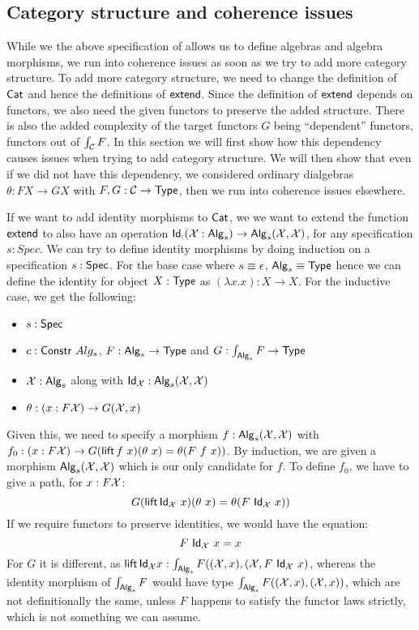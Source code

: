 \documentclass[a4paper,10pt]{article}
\begin{document}
\subsection{Category structure and coherence issues}
\label{sec:hitscategory}

While we the above specification of \hits allows us to define algebras
and algebra morphisms, we run into coherence issues as soon as we try
to add more category structure. To add more category structure, we
need to change the definition of $\mathsf{Cat}$ and hence the definitions of
$\mathsf{extend}$. Since the definition of $\mathsf{extend}$ depends on functors, we
also need the given functors to preserve the added structure. There is
also the added complexity of the target functors $G$ being
``dependent'' functors, \ie functors out of $\int_{\mathcal{C}} F$. In this
section we will first show how this dependency causes issues when
trying to add category structure. We will then show that even if we
did not have this dependency, \ie we considered ordinary dialgebras
$\theta : F X \to G X$ with $F, G : \mathcal{C} \to \mathsf{Type}$, then we run into
coherence issues elsewhere.

If we want to add identity morphisms to $\mathsf{Cat}$, we we want to extend
the function $\mathsf{extend}$ to also have an operation
$\mathsf{Id}_{:} (\mathcal{X} : \mathsf{Alg}_s) \to \mathsf{Alg}_s(\mathcal{X},\mathcal{X})$, for any
specification $s : Spec$. We can try to define identity morphisms by
doing induction on a specification $s : \mathsf{Spec}$. For the base case
where $s \equiv \epsilon$, $\mathsf{Alg}_s \equiv \mathsf{Type}$ hence we can define
the identity for object $X : \mathsf{Type}$ as $(\lambda x . x) : X \to X$. For
the inductive case, we get the following:
%
\begin{itemize}
\item $s : \mathsf{Spec}$ 
\item $c : \mathsf{Constr}\ Alg_s$, \ie $F : \mathsf{Alg}_s \to \mathsf{Type}$ and $G : \int_{\mathsf{Alg}_s} F \to \mathsf{Type}$
\item $\mathcal{X} : \mathsf{Alg}_s$ along with
  $\mathsf{Id}_{\mathcal{X}} : \mathsf{Alg}_s (\mathcal{X},\mathcal{X})$
\item  $\theta : (x : F \mathcal{X}) \to G (\mathcal{X}, x)$
\end{itemize}
%
Given this, we need to specify a morphism
$f : \mathsf{Alg}_s (\mathcal{X},\mathcal{X})$ with
$f_0 : (x : F \alg{X}) \to G (\lift f\ x) (\theta\ x) = \theta (F\ f\
x))$.
By induction, we are given a morphism $\mathsf{Alg}_s (\mathcal{X},\mathcal{X})$ which
is our only candidate for $f$. To define $f_0$, we have to give a path, for $x : F \mathcal{X}$:
$$
G (\operatorname{\mathsf{lift}} \mathsf{Id}_{\mathcal{X}}\ x) (\theta\ x) = \theta (F\ \mathsf{Id}_{\mathcal{X}}\ x))
$$
If we require functors to preserve identities, we would have the equation:
$$
F\ \mathsf{Id}_{\mathcal{X}}\ x = x
$$
For $G$ it is different, as
$\operatorname{\mathsf{lift}} \mathsf{Id}_{\mathcal{X}} x : \int_{\mathsf{Alg}_s} F ((\mathcal{X},x), (\mathcal{X}, F\
\mathsf{Id}_{\mathcal{X}}\ x)$,
whereas the identity morphism of $\int_{\mathsf{Alg}_s} F$ would have type
$\int_{\mathsf{Alg}_s} F ((\mathcal{X},x),(\mathcal{X},x))$, which are not
definitionally the same, unless $F$ happens to satisfy the functor
laws strictly, which is not something we can assume.
\end{document}
